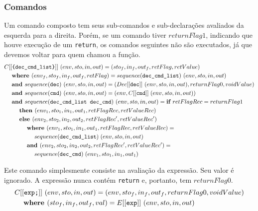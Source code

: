 \documentclass[12pt]{article}
\newcommand\eb[1]{[[\texttt{#1}]]}
\begin{document}
\subsubsection{Comandos}
Um comando composto tem seus sub-comandos e sub-declarações avaliados da esquerda para a direita. Porém, se um comando tiver $returnFlag1$, indicando que houve execução de um {\tt return}, os comandos seguintes não são executados, já que devemos voltar para quem chamou a função.
\begin{align*}
&C\eb{\{dec\_cmd\_list\}}\ (env,sto,in,out) = (sto_f,in_f,out_f,retFlag,retValue) \\
&\hspace{3ex}\textbf{where } (env_f,sto_f,in_f,out_f,retFlag) = sequence(\texttt{dec\_cmd\_list})\ (env,sto,in,out)\\
&\hspace{3ex}\textbf{and } sequence(\texttt{dec})\ (env,sto,in,out) = (Dec\eb{dec}\ (env,sto,in,out), returnFlag0, voidValue)\\
&\hspace{3ex}\textbf{and } sequence(\texttt{cmd})\ (env,sto,in,out) = (env,C\eb{cmd}\;(env,sto,in,out)) \\
&\hspace{3ex}\textbf{and } sequence(\texttt{dec\_cmd\_list dec\_cmd})\ (env,sto,in,out) = \textbf{if } retFlagRec = returnFlag1 \\
&\hspace{6ex}\textbf{then } (env_1,sto_1,in_1,out_1,retFlagRec,retValueRec) \\
&\hspace{6ex}\textbf{else } (env_2,sto_2,in_2,out_2,retFlagRec',retValueRec') \\
&\hspace{9ex}\textbf{where } (env_1, sto_1, in_1, out_1, retFlagRec,retValueRec) = \\ 
&\hspace{12ex}sequence(\texttt{dec\_cmd\_list})\; (env,sto,in,out)\\
&\hspace{9ex}\textbf{and } (env_2,sto_2,in_2,out_2,retFlagRec',retValueRec') = \\ 
&\hspace{12ex}sequence(\texttt{dec\_cmd})\; (env_1,sto_1,in_1,out_1) \\
\end{align*}

Este comando simplesmente consiste na avaliação da expressão. Seu valor é ignorado. A expressão nunca contém {\tt return} e, portanto, tem $returnFlag0$.
\begin{align*}
&C\eb{exp;}\ (env,sto,in,out) = (env,sto_f,in_f,out_f, returnFlag0,voidValue) \\
&\hspace{3ex} \textbf{where } (sto_f,in_f,out_f,val) = E\eb{exp}\  (env,sto,in,out) \\
\end{align*}
\end{document}

